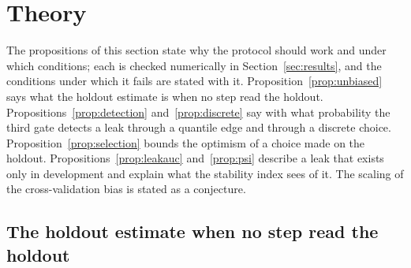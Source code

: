 \section{Theory}
\label{sec:theory}

The propositions of this section state why the protocol should work and under which conditions; each is checked numerically in Section~\ref{sec:results}, and the conditions under which it fails are stated with it. Proposition~\ref{prop:unbiased} says what the holdout estimate is when no step read the holdout. Propositions~\ref{prop:detection} and~\ref{prop:discrete} say with what probability the third gate detects a leak through a quantile edge and through a discrete choice. Proposition~\ref{prop:selection} bounds the optimism of a choice made on the holdout. Propositions~\ref{prop:leakauc} and~\ref{prop:psi} describe a leak that exists only in development and explain what the stability index sees of it. The scaling of the cross-validation bias is stated as a conjecture.

\subsection{The holdout estimate when no step read the holdout}

